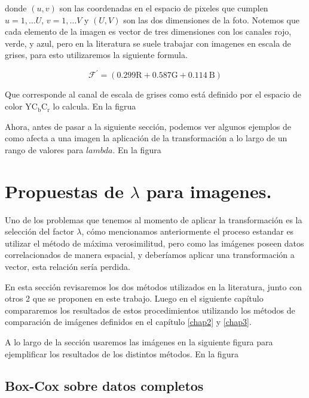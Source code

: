     donde $(u, v)$ son las coordenadas en el espacio de pixeles que cumplen $u=1, \ldots U$, $v=1, \ldots V$ y $(U, V)$ son las dos dimensiones de la foto. Notemos que cada elemento de la imagen es vector de tres dimensiones con los canales rojo, verde, y azul, pero en la literatura se suele trabajar con imagenes en escala de grises, para esto utilizaremos la siguiente formula.

    $$
    \mathcal{F}^{\prime} =(0.299 \mathrm{R}+0.587 \mathrm{G}+0.114 \mathrm{~B})
    $$

    Que corresponde al canal de escala de grises como est\'a definido por el espacio de color $\mathrm{YC}_{\mathrm{b}} \mathrm{C}_{\mathrm{r}}$ lo calcula. En la figrua 
    
    Ahora, antes de pasar a la siguiente secci\'on, podemos ver algunos ejemplos de como afecta a una imagen la aplicaci\'on de la transformaci\'on a lo largo de un rango de valores para $lambda$. En la figura 

    \section[prpuestas de lambda]{Propuestas de $\lambda$ para imagenes.}\label{}

    Uno de los problemas que tenemos al momento de aplicar la transformaci\'on es la selecci\'on del factor $\lambda$, cómo mencionamos anteriormente el proceso estandar es utilizar el m\'etodo de m\'axima verosimilitud, pero como las im\'agenes poseen datos correlacionados de manera espacial, y deberíamos aplicar una transformaci\'on a vector, esta relaci\'on sería perdida. 

    En esta secci\'on revisaremos los dos m\'etodos utilizados en la literatura, junto con otros 2 que se proponen en este trabajo. Luego en el siguiente cap\'itulo compararemos los resultados de estos procedimientos utilizando los m\'etodos de comparaci\'on de im\'agenes definidos en el cap\'itulo \ref{chap2} y \ref{chap3}. 

    A lo largo de la secci\'on usaremos las im\'agenes en la siguiente figura para ejemplificar los resultados de los distintos m\'etodos. En la figura 

    \subsection{Box-Cox sobre datos completos}

